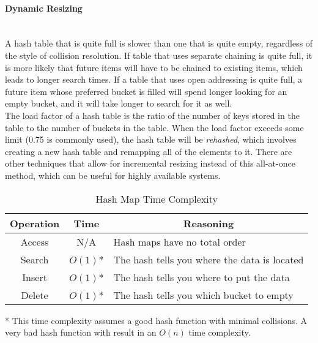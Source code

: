 \paragraph{Dynamic Resizing} \hspace*{1mm} \\
A hash table that is quite full is slower than one that is quite empty, regardless of the style of collision resolution. If table that uses separate chaining is quite full, it is more likely that future items will have to be chained to existing items, which leads to longer search times. If a table that uses open addressing is quite full, a future item whose preferred bucket is filled will spend longer looking for an empty bucket, and it will take longer to search for it as well. \\

The load factor of a hash table is the ratio of the number of keys stored in the table to the number of buckets in the table. When the load factor exceeds some limit (0.75 is commonly used), the hash table will be \textit{rehashed}, which involves creating a new hash table and remapping all of the elements to it. There are other techniques that allow for incremental resizing instead of this all-at-once method, which can be useful for highly available systems.

\begin{table}[H] 
	\begin{threeparttable}
		\caption{Hash Map Time Complexity}
		\label{tab:hashmap}
		\begin{tabularx}{\textwidth}{|c|c|X|}
			\vtabularspace{3}
			\hline
			Operation & Time & \multicolumn{1}{c|}{Reasoning} \\
			\hline
			Access & N/A & Hash maps have no total order \\
			Search & $O(1)$* & The hash tells you where the data is located \\
			Insert & $O(1)$* & The hash tells you where to put the data \\
			Delete & $O(1)$* & The hash tells you which bucket to empty \\
			\hline
		\end{tabularx}
		\vspace*{1mm}
		\begin{tablenotes}\footnotesize
			\item[*] This time complexity assumes a good hash function with minimal collisions. A very bad hash function with result in an $O(n)$ time complexity.
		\end{tablenotes}
		\vspace*{5mm}
	\end{threeparttable}
\end{table}

